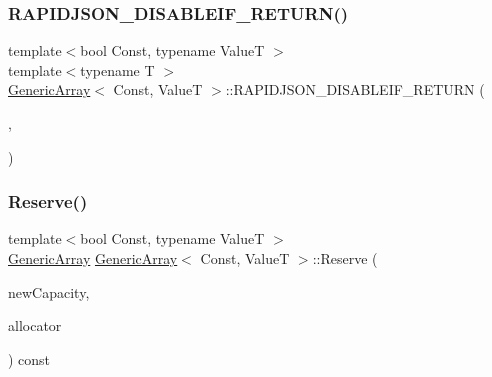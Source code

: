 \mbox{\label{classGenericArray_a12adff0c1e11aa3be6f4160015a65df0}} 
\subsubsection{\texorpdfstring{R\+A\+P\+I\+D\+J\+S\+O\+N\+\_\+\+D\+I\+S\+A\+B\+L\+E\+I\+F\+\_\+\+R\+E\+T\+U\+R\+N()}{RAPIDJSON\_DISABLEIF\_RETURN()}}
{\footnotesize\ttfamily template$<$bool Const, typename ValueT $>$ \\
template$<$typename T $>$ \\
\hyperlink{classGenericArray}{Generic\+Array}$<$ Const, ValueT $>$\+::R\+A\+P\+I\+D\+J\+S\+O\+N\+\_\+\+D\+I\+S\+A\+B\+L\+E\+I\+F\+\_\+\+R\+E\+T\+U\+RN (\begin{DoxyParamCaption}\item[{(internal\+::\+Or\+Expr$<$ internal\+::\+Is\+Pointer$<$ T $>$, \hyperlink{structinternal_1_1IsGenericValue}{internal\+::\+Is\+Generic\+Value}$<$ T $>$ $>$)}]{,  }\item[{(\hyperlink{classGenericArray_a25d2ed55daa117c41db6a5b3f87e9ddc}{const} \hyperlink{classGenericArray}{Generic\+Array}$<$ Const, ValueT $>$ \&)}]{ }\end{DoxyParamCaption})}

\mbox{\label{classGenericArray_a7c74901e8e2174fe4661f4848995f355}} 
\subsubsection{\texorpdfstring{Reserve()}{Reserve()}}
{\footnotesize\ttfamily template$<$bool Const, typename ValueT $>$ \\
\hyperlink{classGenericArray}{Generic\+Array} \hyperlink{classGenericArray}{Generic\+Array}$<$ Const, ValueT $>$\+::Reserve (\begin{DoxyParamCaption}\item[{\hyperlink{rapidjson_8h_a5ed6e6e67250fadbd041127e6386dcb5}{Size\+Type}}]{new\+Capacity,  }\item[{\hyperlink{classGenericArray_af9cdc12de03c742b9c33dfc172756b97}{Allocator\+Type} \&}]{allocator }\end{DoxyParamCaption}) const\hspace{0.3cm}{\ttfamily [inline]}}

